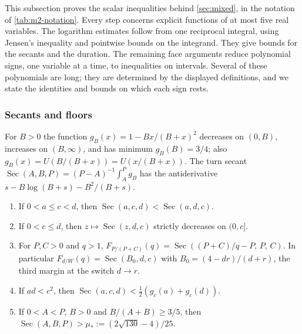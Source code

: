 This subsection proves the scalar inequalities behind \cref{sec:mixed}, in the notation of
\cref{tab:m2-notation}. Every step concerns explicit functions of at most five real variables.
The logarithm estimates follow from one reciprocal integral, using Jensen's inequality and
pointwise bounds on the integrand. They give bounds for the secants and the duration. The
remaining face arguments reduce polynomial signs, one variable at a time, to inequalities on
intervals. Several of these polynomials are long; they are determined by the displayed
definitions, and we state the identities and bounds on which each sign rests.

\subsubsection{Secants and floors}\label{app:m2-secants}

For $B>0$ the function $g_B(x)=1-Bx/(B+x)^2$ decreases on $(0,B)$, increases on $(B,\infty)$, and
has minimum $g_B(B)=3/4$; also $g_B(x)=U(B/(B+x))=U(x/(B+x))$. The turn secant
$\operatorname{Sec}(A,B,P)=(P-A)^{-1}\int_A^Pg_B$ has the antiderivative
$s-B\log(B+s)-B^2/(B+s)$.

\begin{lemma}[Secants]\label{lem:m2-secants}
\begin{enumerate}[label=(\alph*)]
\item If $0<a\le c<d$, then $\operatorname{Sec}(a,c,d)<\operatorname{Sec}(a,d,c)$.
\item If $0<c\le d$, then $z\mapsto\operatorname{Sec}(z,d,c)$ strictly decreases on $(0,c]$.
\item For $P,C>0$ and $q>1$, $F_{P/(P+C)}(q)=\operatorname{Sec}((P+C)/q-P,\,P,\,C)$. In particular
$F_{d/W}(q)=\operatorname{Sec}(B_0,d,c)$ with $B_0=(4-dr)/(d+r)$, the third margin at the switch
$d\to r$.
\item If $ad<c^2$, then $\operatorname{Sec}(a,c,d)<\frac12(g_c(a)+g_c(d))$.
\item If $0<A<P$, $B>0$ and $B/(A+B)\ge3/5$, then $\operatorname{Sec}(A,B,P)>\mu_*:=(2\sqrt{130}-4)/25$.
\end{enumerate}
\end{lemma}

